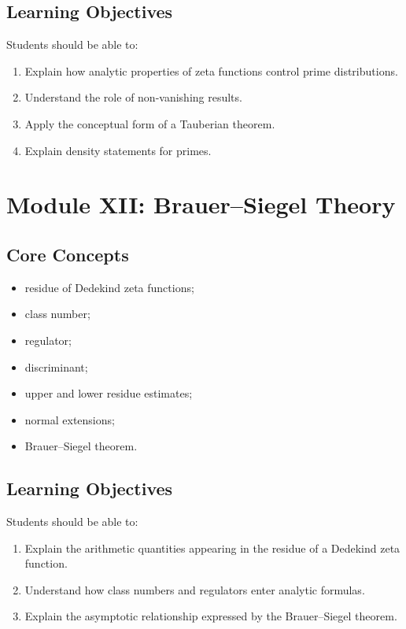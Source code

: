 \documentclass[11pt,a4paper]{article}
\begin{document}
\subsection{Learning Objectives}

Students should be able to:

\begin{enumerate}
    \item Explain how analytic properties of zeta functions control
    prime distributions.
    \item Understand the role of non-vanishing results.
    \item Apply the conceptual form of a Tauberian theorem.
    \item Explain density statements for primes.
\end{enumerate}

\section{Module XII: Brauer--Siegel Theory}

\subsection{Core Concepts}

\begin{itemize}
    \item residue of Dedekind zeta functions;
    \item class number;
    \item regulator;
    \item discriminant;
    \item upper and lower residue estimates;
    \item normal extensions;
    \item Brauer--Siegel theorem.
\end{itemize}

\subsection{Learning Objectives}

Students should be able to:

\begin{enumerate}
    \item Explain the arithmetic quantities appearing in the
    residue of a Dedekind zeta function.
    \item Understand how class numbers and regulators enter
    analytic formulas.
    \item Explain the asymptotic relationship expressed by the
    Brauer--Siegel theorem.
\end{enumerate}
\end{document}
